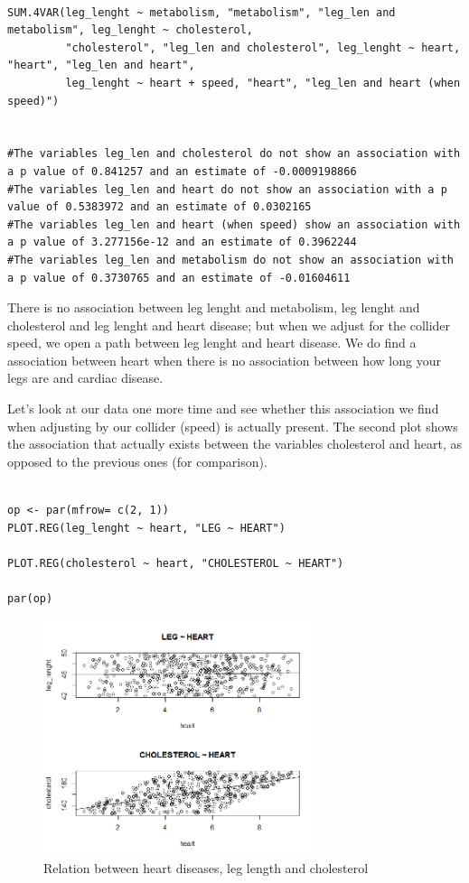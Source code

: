 \documentclass{article}
\begin{document}
\begin{lstlisting}

SUM.4VAR(leg_lenght ~ metabolism, "metabolism", "leg_len and metabolism", leg_lenght ~ cholesterol,
         "cholesterol", "leg_len and cholesterol", leg_lenght ~ heart, "heart", "leg_len and heart", 
         leg_lenght ~ heart + speed, "heart", "leg_len and heart (when speed)")


#The variables leg_len and cholesterol do not show an association with a p value of 0.841257 and an estimate of -0.0009198866 
#The variables leg_len and heart do not show an association with a p value of 0.5383972 and an estimate of 0.0302165 
#The variables leg_len and heart (when speed) show an association with a p value of 3.277156e-12 and an estimate of 0.3962244 
#The variables leg_len and metabolism do not show an association with a p value of 0.3730765 and an estimate of -0.01604611 
\end{lstlisting}
There is no association between leg lenght and metabolism, leg lenght and  cholesterol and leg lenght and heart disease; but when we adjust for the  collider speed, we open a path between leg lenght and heart disease. We  do find  a association between heart when there is no association between  how long your legs are and cardiac disease.\par
Let's look at our data one more time and see whether this association we find when adjusting by our collider (speed) is actually present. The second plot shows the association that actually exists between the variables cholesterol and heart, as opposed to the previous ones (for comparison).\par

\begin{lstlisting}

op <- par(mfrow= c(2, 1))
PLOT.REG(leg_lenght ~ heart, "LEG ~ HEART")

PLOT.REG(cholesterol ~ heart, "CHOLESTEROL ~ HEART")

par(op)
\end{lstlisting}

\begin{figure}[h]
\caption{Relation between heart diseases, leg length and cholesterol}
\includegraphics[width=8cm]{COMP_LEG_CHOL_HEART.png}
\centering
\end{figure}
\newpage
\end{document}
